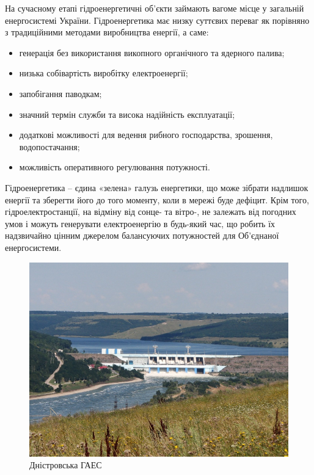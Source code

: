 \documentclass[12pt]{article}
\numberwithin{equation}{section}
\numberwithin{figure}{section}
\begin{document}
На сучасному етапі гідроенергетичні об’єкти займають вагоме місце у загальній енергосистемі України. Гідроенергетика має низку суттєвих переваг як порівняно з традиційними методами виробництва енергії, а саме:

\begin{itemize}
	\item генерація без використання викопного органічного та ядерного палива;
	\item низька собівартість виробітку електроенергії;
	\item запобігання паводкам;
	\item значний термін служби та висока надійність експлуатації;
	\item додаткові можливості для ведення рибного господарства, зрошення, водопостачання;
	\item можливість оперативного регулювання потужності. 
\end{itemize}

Гідроенергетика – єдина «зелена» галузь енергетики, що може зібрати надлишок енергії та зберегти його до того моменту, коли в мережі буде дефіцит. Крім того, гідроелектростанції, на відміну від сонце- та вітро-, не залежать від погодних умов і можуть генерувати електроенергію в будь-який час, що робить їх надзвичайно цінним джерелом балансуючих потужностей для Об’єднаної енергосистеми.

\begin{figure}[!htb]
	\centering
	\includegraphics[width=0.7\linewidth]{03.PNG}
	\caption{Дністровська ГАЕС}
\end{figure}
\end{document}
